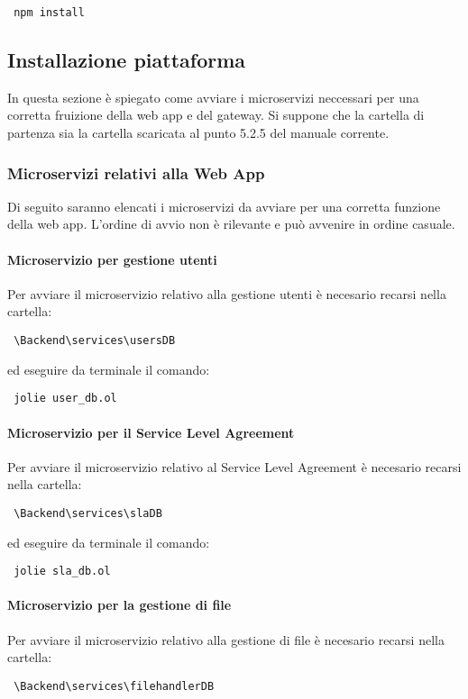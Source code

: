 	\begin{center}
	\verb| npm install|
\end{center}




\subsection{Installazione piattaforma}
In questa sezione è spiegato come avviare i microservizi neccessari per una corretta fruizione della web app e del gateway. Si suppone che la cartella di partenza sia la cartella scaricata al punto 5.2.5 del manuale corrente.
\subsubsection{Microservizi relativi alla Web App}
Di seguito saranno elencati i microservizi da avviare per una corretta funzione della web app. L'ordine di avvio non è rilevante e può avvenire in ordine casuale.
	\paragraph{Microservizio per gestione utenti}
	Per avviare il microservizio relativo alla gestione utenti è necesario recarsi nella cartella:
	\begin{center}
		\verb| \Backend\services\usersDB|
	\end{center}
	
	ed eseguire da terminale il comando:
	
	\begin{center}
		\verb| jolie user_db.ol |
	\end{center}

	\paragraph{Microservizio per il Service Level Agreement}
	Per avviare il microservizio relativo al Service Level Agreement è necesario recarsi nella cartella:
	\begin{center}
		\verb| \Backend\services\slaDB|
	\end{center}
	
	ed eseguire da terminale il comando:
	
	\begin{center}
		\verb| jolie sla_db.ol |
	\end{center}

	\paragraph{Microservizio per la gestione di file}
	Per avviare il microservizio relativo alla gestione di file è necesario recarsi nella cartella:
	\begin{center}
		\verb| \Backend\services\filehandlerDB|
	\end{center}
	
